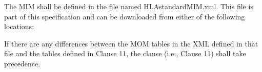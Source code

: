 
\clearpage

\begin{annexstdpage}

    The MIM shall be defined in the file named HLAstandardMIM.xml. This file is part of this specification and can be downloaded from either of the following locations:

    \begin{stddashlist}
        \item {}
        \item {}
    \end{stddashlist}

    If there are any differences between the MOM tables in the XML defined in that file and the tables defined in Clause 11, the clause (i.e., Clause 11) shall take precedence.
\end{annexstdpage}

\clearpage

\thispagestyle{body}
\null

